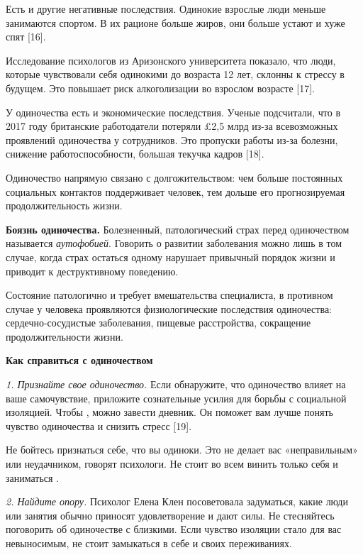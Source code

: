 Есть и другие негативные последствия.
Одинокие взрослые люди меньше занимаются спортом.
В их рационе больше жиров, они больше устают и хуже спят [16].

Исследование психологов из Аризонского университета показало,
что люди, которые чувствовали себя одинокими до возраста 12 лет,
склонны к стрессу в будущем.
Это повышает риск алкоголизации во взрослом возрасте [17].

У одиночества есть и экономические последствия.
Ученые подсчитали, что в 2017 году британские работодатели
потеряли £2,5 млрд из-за всевозможных проявлений одиночества у сотрудников.
Это пропуски работы из-за болезни,
снижение работоспособности, большая текучка кадров [18].

Одиночество напрямую связано с долгожительством:
чем больше постоянных социальных контактов поддерживает человек,
тем дольше его прогнозируемая продолжительность жизни.

\textbf{Боязнь одиночества.}
Болезненный, патологический страх перед одиночеством называется
\textit{аутофобией}. Говорить о развитии заболевания можно лишь
в том случае, когда страх остаться одному нарушает привычный
порядок жизни и приводит к деструктивному поведению.

Состояние патологично и требует вмешательства специалиста,
в противном случае у человека проявляются физиологические последствия
одиночества: сердечно-сосудистые заболевания, пищевые расстройства,
сокращение продолжительности жизни.


\textbf{Как справиться с одиночеством}

\textit{1. Признайте свое одиночество.}
Если обнаружите, что одиночество влияет на ваше самочувствие,
приложите сознательные усилия для борьбы с социальной изоляцией.
Чтобы ,
можно завести дневник.
Он поможет вам лучше понять чувство одиночества и снизить стресс [19].

Не бойтесь признаться себе, что вы одиноки.
Это не делает вас «неправильным» или неудачником,
говорят психологи.
Не стоит во всем винить только себя и заниматься
.

\textit{2. Найдите опору.}
Психолог Елена Клен посоветовала задуматься, какие люди или занятия
обычно приносят удовлетворение и дают силы.
Не стесняйтесь поговорить об одиночестве с близкими.
Если чувство изоляции стало для вас невыносимым,
не стоит замыкаться в себе и своих переживаниях.


